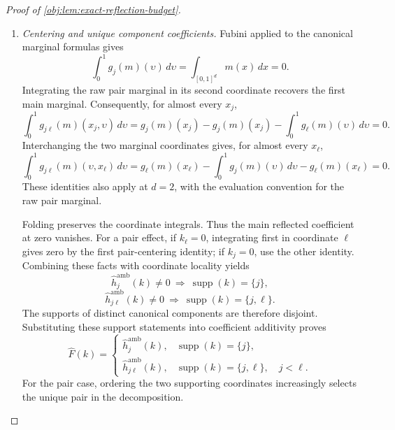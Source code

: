 \documentclass[11pt]{article}
\begin{document}
\begin{proof}[Proof of \cref{obj:lem:exact-reflection-budget}]
\begin{enumerate}
\item \textit{Centering and unique component coefficients.}
Fubini applied to the canonical marginal formulas gives
\[
\int_0^1g_j(m)(\upsilon)\,d\upsilon
=
\int_{[0,1]^d}m(x)\,dx
=
0.
\]
Integrating the raw pair marginal in its second coordinate recovers the first main marginal. Consequently, for almost every \(x_j\),
\[
\int_0^1g_{j\ell}(m)(x_j,\upsilon)\,d\upsilon
=
g_j(m)(x_j)-g_j(m)(x_j)
-\int_0^1g_\ell(m)(\upsilon)\,d\upsilon
=
0.
\]
Interchanging the two marginal coordinates gives, for almost every \(x_\ell\),
\[
\int_0^1g_{j\ell}(m)(\upsilon,x_\ell)\,d\upsilon
=
g_\ell(m)(x_\ell)
-\int_0^1g_j(m)(\upsilon)\,d\upsilon
-g_\ell(m)(x_\ell)
=
0.
\]
These identities also apply at \(d=2\), with the evaluation convention for the raw pair marginal.

Folding preserves the coordinate integrals. Thus the main reflected coefficient at zero vanishes. For a pair effect, if \(k_\ell=0\), integrating first in coordinate \(\ell\) gives zero by the first pair-centering identity; if \(k_j=0\), use the other identity. Combining these facts with coordinate locality yields
\[
\widehat h_j^{\mathrm{amb}}(k)\neq0
\ \Longrightarrow\
\operatorname{supp}(k)=\{j\},
\]
\[
\widehat h_{j\ell}^{\mathrm{amb}}(k)\neq0
\ \Longrightarrow\
\operatorname{supp}(k)=\{j,\ell\}.
\]
The supports of distinct canonical components are therefore disjoint. Substituting these support statements into coefficient additivity proves
\[
\widehat F(k)
=
\begin{cases}
\widehat h_j^{\mathrm{amb}}(k),
&\operatorname{supp}(k)=\{j\},\\
\widehat h_{j\ell}^{\mathrm{amb}}(k),
&\operatorname{supp}(k)=\{j,\ell\},\quad j<\ell.
\end{cases}
\]
For the pair case, ordering the two supporting coordinates increasingly selects the unique pair in the decomposition.


\end{enumerate}
\end{proof}
\end{document}

